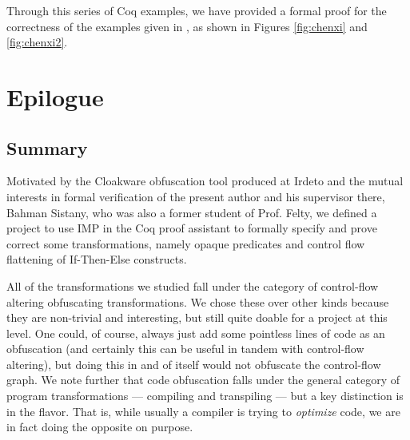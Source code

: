 \documentclass[12pt,notitlepage]{report}
\theoremstyle{plain}
\theoremstyle{definition}
\numberwithin{equation}{section}
\begin{document}
Through this series of Coq examples, we have provided a formal proof for the correctness of the examples given in \cite{Wang}, as shown in Figures \ref{fig:chenxi} and \ref{fig:chenxi2}.

\chapter{Epilogue}
\section{Summary}
Motivated by the Cloakware obfuscation tool produced at Irdeto and the mutual interests in formal verification of the present author and his supervisor there, Bahman Sistany, who was also a former student of Prof. Felty, we defined a project to use IMP in the Coq proof assistant to formally specify and prove correct some transformations, namely opaque predicates and control flow flattening of If-Then-Else constructs.
\par All of the transformations we studied fall under the category of control-flow altering obfuscating transformations.  We chose these over other kinds because they are non-trivial and interesting, but still quite doable for a project at this level.  One could, of course, always just add some pointless lines of code as an obfuscation (and certainly this can be useful in tandem with control-flow altering), but doing this in and of itself would not obfuscate the control-flow graph.  We note further that code obfuscation falls under the general category of program transformations --- compiling and transpiling --- but a key distinction is in the flavor.  That is, while usually a compiler is trying to \emph{optimize} code, we are in fact doing the opposite on purpose.
\end{document}
